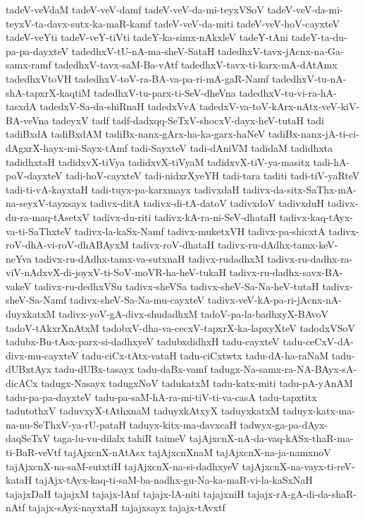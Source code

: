 {tadeV-veVdaM
tadeV-veV-damf
tadeV-veV-da-mi-teyxVSoV
tadeV-veV-da-mi-teyxV-ta-davx-sutx-ka-maR-kamf
tadeV-veV-da-miti
tadeV-veV-hoV-cayxteV
tadeV-veYti
tadeV-veY-tiVti
tadeY-ka-simx-nAkxleV
tadeY-tAni
tadeY-ta-du-pa-pa-dayxteV
tadedhxV-tU-nA-ma-sheV-SataH
tadedhxV-tavx-jAcnx-na-Ga-samx-ramf
tadedhxV-tavx-saM-Ba-vAtf
tadedhxV-tavx-ti-karx-mA-dAtAmx
tadedhxVtoVH
tadedhxV-toV-ra-BA-va-pa-ri-mA-gaR-Namf
tadedhxV-tu-nA-shA-tapxrX-kaqtiM
tadedhxV-tu-parx-ti-SeV-dheVna
tadedhxV-tu-vi-ra-hA-tasxdA
tadedxV-Sa-da-shiRnaH
tadedxVvA
tadedxV-va-toV-kArx-nAtx-veV-kiV-BA-veVna
tadeyxV
tadf
tadf-dadxqq-SeTxV-shocxV-dayx-heV-tutaH
tadi
tadiBxdA
tadiBxdAM
tadiBx-nanx-gArx-ha-ka-garx-haNeV
tadiBx-nanx-jA-ti-ci-dAgxrX-hayx-mi-Sayx-tAmf
tadi-SayxteV
tadi-dAniVM
tadidaM
tadidhxta
tadidhxtaH
tadidxvX-tiVya
tadidxvX-tiVyaM
tadidxvX-tiV-ya-masitx
tadi-hA-poV-dayxteV
tadi-hoV-cayxteV
tadi-nidxrXyeYH
tadi-tara
taditi
tadi-tiV-yaRteV
tadi-ti-vA-kayxtaH
tadi-tuyx-pa-karxmayx
tadivxdaH
tadivx-da-sitx-SaThx-mA-na-seyxV-tayxsayx
tadivx-ditA
tadivx-di-tA-datoV
tadivxdoV
tadivxduH
tadivx-du-ra-maq-tAsetxV
tadivx-du-riti
tadivx-kA-ra-ni-SeV-dhataH
tadivx-kaq-tAyx-va-ti-SaThxteV
tadivx-la-kaSx-Namf
tadivx-muketxVH
tadivx-pa-shicxtA
tadivx-roV-dhA-vi-roV-dhABAyxM
tadivx-roV-dhataH
tadivx-ru-dAdhx-tamx-keV-neYva
tadivx-ru-dAdhx-tamx-va-sutxnaH
tadivx-rudadhxM
tadivx-ru-dadhx-ra-viV-nAdxvX-di-joyxV-ti-SoV-moVR-ha-heV-tukaH
tadivx-ru-dadhx-savx-BA-vakeV
tadivx-ru-dedhxVSu
tadivx-sheVSa
tadivx-sheV-Sa-Na-heV-tutaH
tadivx-sheV-Sa-Namf
tadivx-sheV-Sa-Na-mu-cayxteV
tadivx-veV-kA-pa-ri-jAcnx-nA-duyxkatxM
tadivx-yoV-gA-divx-shudadhxM
tadoV-pa-la-badhxyX-BAvoV
tadoV-tAkxrXnAtxM
tadobxV-dha-va-cecxV-tapxrX-ka-lapxyXteV
tadodxVSoV
tadubx-Bu-tAsx-parx-si-dadhxyeV
tadubxdidhxH
tadu-cayxteV
tadu-ceCxV-dA-divx-mu-cayxteV
tadu-ciCx-tAtx-vataH
tadu-ciCxtwtx
tadu-dA-ha-raNaM
tadu-dUBxtAyx
tadu-dUBx-tasayx
tadu-daBx-vamf
tadugx-Na-samx-ra-NA-BAyx-sA-dicACx
tadugx-Nasayx
tadugxNoV
tadukatxM
tadu-katx-miti
tadu-pA-yAnAM
tadu-pa-pa-dayxteV
tadu-pa-saM-hA-ra-mi-tiV-ti-va-casA
tadu-tapxtitx
tadutothxV
taduvxyX-tAthxnaM
taduyxkAtxyX
taduyxkatxM
taduyx-katx-ma-na-nu-SeThxV-ya-rU-pataH
taduyx-kitx-ma-davxcaH
tadwyx-ga-pa-dAyx-daqSeTxV
taga-lu-vu-dilalx
tahiR
taimeV
tajAjxcnX-nA-da-vaq-kASx-thaR-ma-ti-BaR-veVtf
tajAjxcnX-nAtAsx
tajAjxcnXnaM
tajAjxcnX-na-ja-namxnoV
tajAjxcnX-na-saM-sutxtiH
tajAjxcnX-na-si-dadhxyeV
tajAjxcnX-na-vayx-ti-reV-kataH
tajAjx-tAyx-kaq-ti-saM-ba-nadhx-gu-Na-ka-maR-vi-la-kaSxNaH
tajajxDaH
tajajxM
tajajx-lAnf
tajajx-lA-niti
tajajxniH
tajajx-rA-gA-di-da-shaR-nAtf
tajajx-sAyx-nayxtaH
tajajxsayx
tajajx-tAvxtf
}
